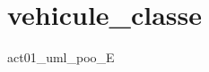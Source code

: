 \chapter{vehicule\+\_\+classe}
\hypertarget{md__r_e_a_d_m_e}{}\label{md__r_e_a_d_m_e}
\label{md__r_e_a_d_m_e_autotoc_md0}%
%
act01\+\_\+uml\+\_\+poo\+\_\+E 